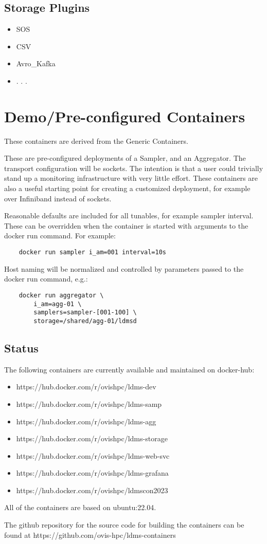 \documentclass{article}
\begin{document}
\subsection{Storage Plugins}
\begin{itemize}
\item SOS
\item CSV
\item Avro\_Kafka
\item . . .
\end{itemize}

\section{Demo/Pre-configured Containers}
These containers are derived from the Generic Containers.

These are pre-configured deployments of a Sampler, and an Aggregator. The transport configuration will be sockets. The intention is that a user could trivially stand up a monitoring infrastructure with very little effort. These containers are also a useful starting point for creating a customized deployment, for example over Infiniband instead of sockets.

Reasonable defaults are included for all tunables, for example sampler interval. These can be overridden when the container is started with arguments to the docker run command. For example:

\begin{verbatim}
    docker run sampler i_am=001 interval=10s
\end{verbatim}

Host naming will be normalized and controlled by parameters passed to the docker run command, e.g.:

\begin{verbatim}
    docker run aggregator \
        i_am=agg-01 \
        samplers=sampler-[001-100] \
        storage=/shared/agg-01/ldmsd
\end{verbatim}

\subsection{Status}
The following containers are currently available and maintained on docker-hub:
\begin{itemize}
\item https://hub.docker.com/r/ovishpc/ldms-dev
\item https://hub.docker.com/r/ovishpc/ldms-samp
\item https://hub.docker.com/r/ovishpc/ldms-agg
\item https://hub.docker.com/r/ovishpc/ldms-storage
\item https://hub.docker.com/r/ovishpc/ldms-web-svc
\item https://hub.docker.com/r/ovishpc/ldms-grafana
\item https://hub.docker.com/r/ovishpc/ldmscon2023
\end{itemize}
All of the containers are based on ubuntu:22.04.

The github repository for the source code for building the containers can be found at https://github.com/ovis-hpc/ldms-containers
\end{document}
